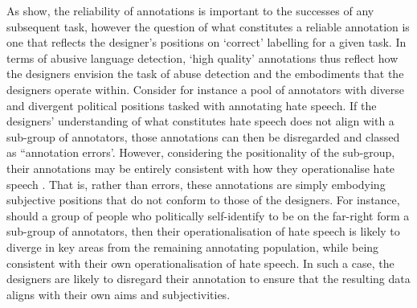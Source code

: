 {As \citet{Hovy:2013} show, the reliability of annotations is important to the successes of any subsequent task, however the question of what constitutes a reliable annotation is one that reflects the designer's positions on `correct' labelling for a given task.
In terms of abusive language detection, `high quality' annotations thus reflect how the designers envision the task of abuse detection and the embodiments that the designers operate within.
Consider for instance a pool of annotators with diverse and divergent political positions tasked with annotating hate speech.
If the designers' understanding of what constitutes hate speech does not align with a sub-group of annotators, those annotations can then be disregarded and classed as ``annotation errors'. 
However, considering the positionality of the  sub-group, their annotations may be entirely consistent with how they operationalise hate speech .
That is, rather than errors, these annotations are simply embodying subjective positions that do not conform to those of the designers.
For instance, should a group of people who politically self-identify to be on the far-right form a sub-group of annotators, then their operationalisation of hate speech is likely to diverge in key areas from the remaining annotating population, while being consistent with their own operationalisation of hate speech.
In such a case, the designers are likely to disregard their annotation to ensure that the resulting data aligns with their own aims and subjectivities.

}
